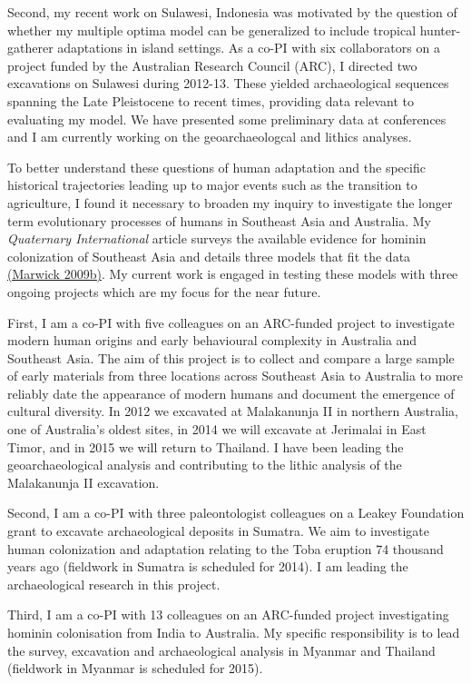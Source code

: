 \documentclass[11pt,article,oneside]{memoir}
\begin{document}
Second, my recent work on Sulawesi, Indonesia was motivated by the question of whether my multiple optima model can be generalized to include tropical hunter-gatherer adaptations in island settings. As a co-PI with six collaborators on a project funded by the Australian Research Council (ARC), I directed two excavations on Sulawesi during 2012-13. These yielded archaeological sequences spanning the Late Pleistocene to recent times, providing data relevant to evaluating my model. We have presented some preliminary data at conferences and I am currently working on the geoarchaeologcal and lithics analyses.

To better understand these questions of human adaptation and the specific historical trajectories leading up to major events such as the transition to agriculture, I found it necessary to broaden my inquiry to investigate the longer term evolutionary processes of humans in Southeast Asia and Australia. My \textit{Quaternary International} article surveys the available evidence for hominin colonization of Southeast Asia and details three models that fit the data {\href{http://faculty.washington.edu/bmarwick/PDFs/Marwick_2009_QI.pdf}{(Marwick 2009b)}}. My current work is engaged in testing these models with three ongoing projects which are my focus for the near future. 

First, I am a co-PI with five colleagues on an ARC-funded project to investigate modern human origins and early behavioural complexity in Australia and Southeast Asia. The aim of this project is to collect and compare a large sample of early materials from three locations across Southeast Asia to Australia to more reliably date the appearance of modern humans and document the emergence of cultural diversity. In 2012 we excavated at Malakanunja II in northern Australia, one of Australia's oldest sites, in 2014 we will excavate at Jerimalai in East Timor, and in 2015 we will return to Thailand. I have been leading the geoarchaeological analysis and contributing to the lithic analysis of the Malakanunja II excavation. 

Second, I am a co-PI with three paleontologist colleagues on a Leakey Foundation grant to excavate archaeological deposits in Sumatra. We aim to investigate human colonization and adaptation relating to the Toba eruption 74 thousand years ago (fieldwork in Sumatra is scheduled for 2014). I am leading the archaeological research in this project.

Third, I am a co-PI with 13 colleagues on an ARC-funded project investigating hominin colonisation from India to Australia. My specific responsibility is to lead the survey, excavation and archaeological analysis in Myanmar and Thailand (fieldwork in Myanmar is scheduled for 2015).
\end{document}
